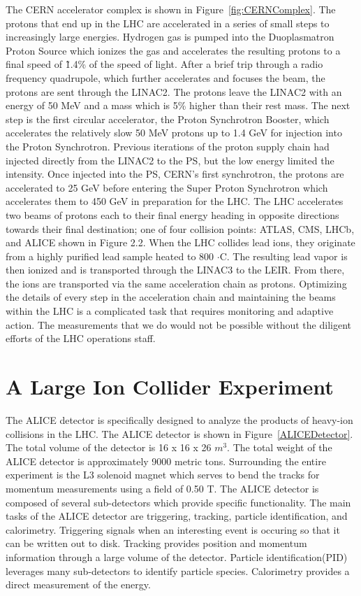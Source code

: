 The CERN accelerator complex is shown in Figure~\ref{fig:CERNComplex}. The protons that end up in the LHC are accelerated in a series of small steps to increasingly large energies. Hydrogen gas is pumped into the Duoplasmatron Proton Source which ionizes the gas and accelerates the resulting protons to a final speed of \~1.4\% of the speed of light. After a brief trip through a radio frequency quadrupole, which further accelerates and focuses the beam, the protons are sent through the LINAC2. The protons leave the LINAC2 with an energy of 50 MeV and a mass which is 5\% higher than their rest mass. The next step is the first circular accelerator, the Proton Synchrotron Booster, which accelerates the relatively slow 50 MeV protons up to 1.4 GeV for injection into the Proton Synchrotron. Previous iterations of the proton supply chain had injected directly from the LINAC2 to the PS, but the low energy limited the intensity. Once injected into the PS, CERN's first synchrotron, the protons are accelerated to 25 GeV before entering the Super Proton Synchrotron which accelerates them to 450 GeV in preparation for the LHC. The LHC accelerates two beams of protons each to their final energy heading in opposite directions towards their final destination; one of four collision points: ATLAS, CMS, LHCb, and ALICE shown in Figure 2.2. When the LHC collides lead ions, they originate from a highly purified lead sample heated to 800 $\cdot$C. The resulting lead vapor is then ionized and is transported through the LINAC3 to the LEIR. From there, the ions are transported via the same acceleration chain as protons. Optimizing the details of every step in the acceleration chain and maintaining the beams within the LHC is a complicated task that requires monitoring and adaptive action. The measurements that we do would not be possible without the diligent efforts of the LHC operations staff.



\section{A Large Ion Collider Experiment}
The ALICE detector is specifically designed to analyze the products of heavy-ion collisions in the LHC. The ALICE detector is shown in Figure~\ref{ALICEDetector}. The total volume of the detector is 16 x 16 x 26 $m^3$. The total weight of the ALICE detector is approximately 9000 metric tons. Surrounding the entire experiment is the L3 solenoid magnet which serves to bend the tracks for momentum measurements using a field of 0.50 T. The ALICE detector is composed of several sub-detectors which provide specific functionality. The main tasks of the ALICE detector are triggering, tracking, particle identification, and calorimetry. Triggering signals when an interesting event is occuring so that it can be written out to disk. Tracking provides position and momentum information through a large volume of the detector. Particle identification(PID) leverages many sub-detectors to identify particle species. Calorimetry provides a direct measurement of the energy.

